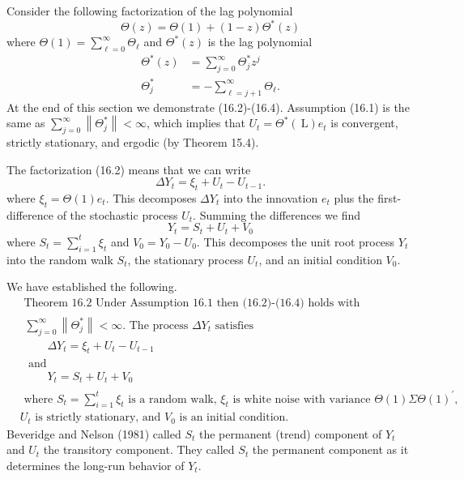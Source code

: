 \documentclass[10pt]{article}
\begin{document}
Consider the following factorization of the lag polynomial
$$
\Theta(z)=\Theta(1)+(1-z) \Theta^{*}(z)
$$
where $\Theta(1)=\sum_{\ell=0}^{\infty} \Theta_{\ell}$ and $\Theta^{*}(z)$ is the lag polynomial
$$
\begin{aligned}
\Theta^{*}(z) &=\sum_{j=0}^{\infty} \Theta_{j}^{*} z^{j} \\
\Theta_{j}^{*} &=-\sum_{\ell=j+1}^{\infty} \Theta_{\ell} .
\end{aligned}
$$
At the end of this section we demonstrate (16.2)-(16.4). Assumption (16.1) is the same as $\sum_{j=0}^{\infty}\left\|\Theta_{j}^{*}\right\|<\infty$, which implies that $U_{t}=\Theta^{*}(\mathrm{~L}) e_{t}$ is convergent, strictly stationary, and ergodic (by Theorem 15.4).

The factorization (16.2) means that we can write
$$
\Delta Y_{t}=\xi_{t}+U_{t}-U_{t-1} .
$$
where $\xi_{t}=\Theta(1) e_{t}$. This decomposes $\Delta Y_{t}$ into the innovation $e_{t}$ plus the first-difference of the stochastic process $U_{t}$. Summing the differences we find
$$
Y_{t}=S_{t}+U_{t}+V_{0}
$$
where $S_{t}=\sum_{i=1}^{t} \xi_{t}$ and $V_{0}=Y_{0}-U_{0}$. This decomposes the unit root process $Y_{t}$ into the random walk $S_{t}$, the stationary process $U_{t}$, and an initial condition $V_{0}$.

We have established the following.
$$
\begin{aligned}
&\text { Theorem 16.2 Under Assumption } 16.1 \text { then (16.2)-(16.4) holds with } \\
&\begin{array}{l}
\sum_{j=0}^{\infty}\left\|\Theta_{j}^{*}\right\|<\infty \text {. The process } \Delta Y_{t} \text { satisfies } \\
\qquad \Delta Y_{t}=\xi_{t}+U_{t}-U_{t-1} \\
\text { and } \\
\qquad Y_{t}=S_{t}+U_{t}+V_{0}
\end{array} \\
&\text { where } S_{t}=\sum_{i=1}^{t} \xi_{t} \text { is a random walk, } \xi_{t} \text { is white noise with variance } \Theta(1) \Sigma \Theta(1)^{\prime}, \\
&U_{t} \text { is strictly stationary, and } V_{0} \text { is an initial condition. }
\end{aligned}
$$
Beveridge and Nelson (1981) called $S_{t}$ the permanent (trend) component of $Y_{t}$ and $U_{t}$ the transitory component. They called $S_{t}$ the permanent component as it determines the long-run behavior of $Y_{t}$.
\end{document}
